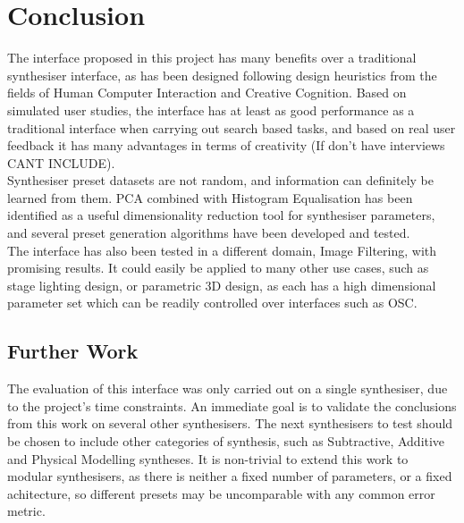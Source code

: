 \documentclass[11pt, oneside]{report}   	%
\begin{document}
%

\chapter{Conclusion}
The interface proposed in this project has many benefits over a traditional synthesiser interface, as has been designed following design heuristics from the fields of Human Computer Interaction and Creative Cognition. Based on simulated user studies, the interface has at least as good performance as a traditional interface when carrying out search based tasks, and based on real user feedback it has many advantages in terms of creativity (If don't have interviews CANT INCLUDE). \\
Synthesiser preset datasets are not random, and information can definitely be learned from them. PCA combined with Histogram Equalisation has been identified as a useful dimensionality reduction tool for synthesiser parameters, and several preset generation algorithms have been developed and tested. \\
The interface has also been tested in a different domain, Image Filtering, with promising results. It could easily be applied to many other use cases, such as stage lighting design, or parametric 3D design, as each has a high dimensional parameter set which can be readily controlled over interfaces such as OSC.
\section{Further Work}
The evaluation of this interface was only carried out on a single synthesiser, due to the project's time constraints. An immediate goal is to validate the conclusions from this work on several other synthesisers. The next synthesisers to test should be chosen to include other categories of synthesis, such as Subtractive, Additive and Physical Modelling syntheses. It is non-trivial to extend this work to modular synthesisers, as there is neither a fixed number of parameters, or a fixed achitecture, so different presets may be uncomparable with any common error metric.
\end{document}

